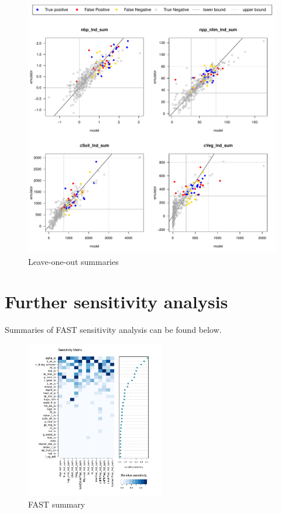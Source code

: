 \documentclass[gmd, manuscript]{copernicus}
\begin{document}
\begin{figure}[t]
\includegraphics[width=12cm]{./graphics/Y_const_loo.pdf}
\caption{Leave-one-out summaries }
\label{fig:Y_const_loo}
\end{figure}



\section{Further sensitivity analysis}

Summaries of FAST sensitivity analysis can be found below.

\begin{figure}[t]
\includegraphics[width=6cm]{./graphics/FAST_sensmat_Y_level1a.pdf}
\caption{FAST summary}
\label{fig:FAST_sensmat_Y_level1a}
\end{figure}
\end{document}
